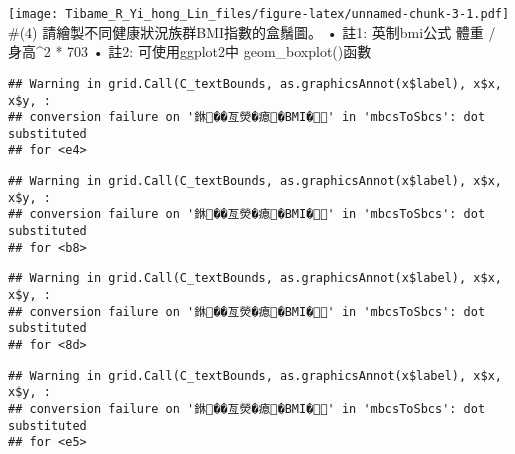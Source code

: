 \documentclass[
]{article}
\newenvironment{Shaded}{\begin{snugshade}}{\end{snugshade}}
\newcommand{\DataTypeTok}[1]{\textcolor[rgb]{0.13,0.29,0.53}{#1}}
\newcommand{\DecValTok}[1]{\textcolor[rgb]{0.00,0.00,0.81}{#1}}
\newcommand{\FloatTok}[1]{\textcolor[rgb]{0.00,0.00,0.81}{#1}}
\newcommand{\KeywordTok}[1]{\textcolor[rgb]{0.13,0.29,0.53}{\textbf{#1}}}
\newcommand{\NormalTok}[1]{#1}
\newcommand{\OperatorTok}[1]{\textcolor[rgb]{0.81,0.36,0.00}{\textbf{#1}}}
\newcommand{\StringTok}[1]{\textcolor[rgb]{0.31,0.60,0.02}{#1}}
\begin{document}
\texttt{[image: Tibame\_R\_Yi\_hong\_Lin\_files/figure-latex/unnamed-chunk-3-1.pdf]}
\#(4) 請繪製不同健康狀況族群BMI指數的盒鬚圖。 • 註1: 英制bmi公式 體重 /
身高\^{}2 * 703 • 註2: 可使用ggplot2中 geom\_boxplot()函數

\begin{Shaded}
\end{Shaded}

\begin{verbatim}
## Warning in grid.Call(C_textBounds, as.graphicsAnnot(x$label), x$x, x$y, :
## conversion failure on '銝��亙熒�瘜�BMI�' in 'mbcsToSbcs': dot substituted
## for <e4>
\end{verbatim}

\begin{verbatim}
## Warning in grid.Call(C_textBounds, as.graphicsAnnot(x$label), x$x, x$y, :
## conversion failure on '銝��亙熒�瘜�BMI�' in 'mbcsToSbcs': dot substituted
## for <b8>
\end{verbatim}

\begin{verbatim}
## Warning in grid.Call(C_textBounds, as.graphicsAnnot(x$label), x$x, x$y, :
## conversion failure on '銝��亙熒�瘜�BMI�' in 'mbcsToSbcs': dot substituted
## for <8d>
\end{verbatim}

\begin{verbatim}
## Warning in grid.Call(C_textBounds, as.graphicsAnnot(x$label), x$x, x$y, :
## conversion failure on '銝��亙熒�瘜�BMI�' in 'mbcsToSbcs': dot substituted
## for <e5>
\end{verbatim}
\end{document}
